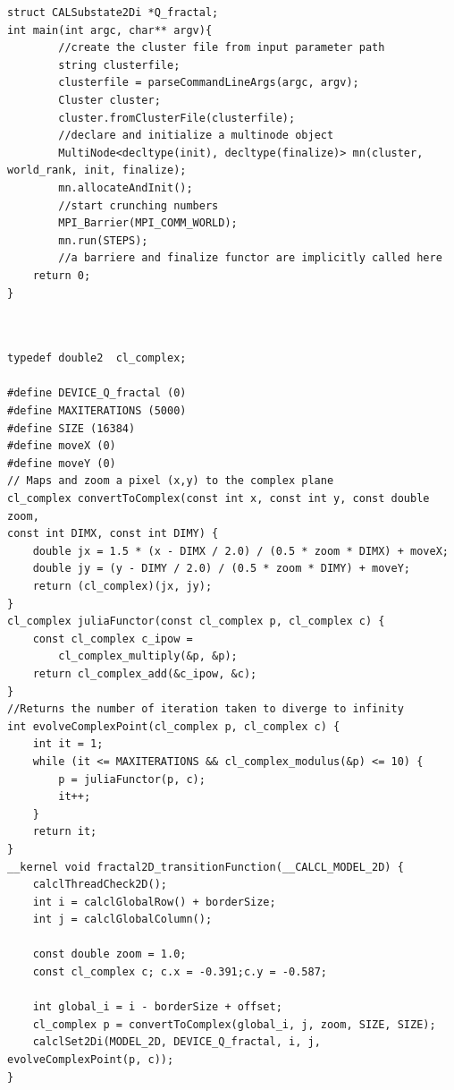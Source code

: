{\begin{lstlisting}
struct CALSubstate2Di *Q_fractal; 
int main(int argc, char** argv){
		//create the cluster file from input parameter path
		string clusterfile;
		clusterfile = parseCommandLineArgs(argc, argv);
		Cluster cluster;
		cluster.fromClusterFile(clusterfile);
	    //declare and initialize a multinode object
		MultiNode<decltype(init), decltype(finalize)> mn(cluster, world_rank, init, finalize);
		mn.allocateAndInit();
	    //start crunching numbers
		MPI_Barrier(MPI_COMM_WORLD);
		mn.run(STEPS);
		//a barriere and finalize functor are implicitly called here
	return 0;
}



\end{lstlisting}

\begin{lstlisting}
typedef double2  cl_complex;

#define DEVICE_Q_fractal (0)
#define MAXITERATIONS (5000)
#define SIZE (16384)
#define moveX (0)
#define moveY (0)
// Maps and zoom a pixel (x,y) to the complex plane
cl_complex convertToComplex(const int x, const int y, const double zoom,
const int DIMX, const int DIMY) {
	double jx = 1.5 * (x - DIMX / 2.0) / (0.5 * zoom * DIMX) + moveX;
	double jy = (y - DIMY / 2.0) / (0.5 * zoom * DIMY) + moveY;
	return (cl_complex)(jx, jy);
}
cl_complex juliaFunctor(const cl_complex p, cl_complex c) {
	const cl_complex c_ipow =
		cl_complex_multiply(&p, &p); 
	return cl_complex_add(&c_ipow, &c);
}
//Returns the number of iteration taken to diverge to infinity 
int evolveComplexPoint(cl_complex p, cl_complex c) {
	int it = 1;
	while (it <= MAXITERATIONS && cl_complex_modulus(&p) <= 10) {
		p = juliaFunctor(p, c);
		it++;
	}
	return it;
}
__kernel void fractal2D_transitionFunction(__CALCL_MODEL_2D) {
	calclThreadCheck2D();
	int i = calclGlobalRow() + borderSize;
	int j = calclGlobalColumn();
	
	const double zoom = 1.0;
	const cl_complex c;	c.x = -0.391;c.y = -0.587;
	
	int global_i = i - borderSize + offset;
	cl_complex p = convertToComplex(global_i, j, zoom, SIZE, SIZE);
	calclSet2Di(MODEL_2D, DEVICE_Q_fractal, i, j, evolveComplexPoint(p, c));
}
\end{lstlisting}


}
